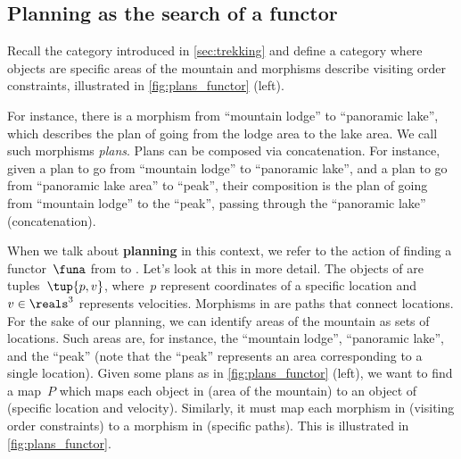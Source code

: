 \subsection{Planning as the search of a functor}

\begin{example}
    \label{ex:planning-as-search-functor}
    Recall the category \Berg introduced in \cref{sec:trekking} and define a category \Plans where objects are specific areas of the mountain and morphisms describe visiting order constraints, illustrated in \cref{fig:plans_functor} (left).

    For instance, there is a morphism from ``mountain lodge'' to ``panoramic lake'', which describes the plan of going from the lodge area to the lake area.
    We call such morphisms \emph{plans}.
    Plans can be composed via concatenation.
    For instance, given a plan to go from ``mountain lodge'' to ``panoramic lake'', and a plan to go from ``panoramic lake area'' to ``peak'', their composition is the plan of going from ``mountain lodge'' to the ``peak'', passing through the ``panoramic lake'' (concatenation).

    When we talk about \textbf{planning} in this context, we refer to the action of finding a functor~$\funa$ from \Plans to \Berg.
    Let's look at this in more detail.
    The objects of \Berg are tuples~$\tup{p,v}$, where~$p$ represent coordinates of a specific location and~$v\in \reals^3$ represents velocities.
    Morphisms in \Berg are paths that connect locations.
    For the sake of our planning, we can identify areas of the mountain as sets of locations.
    Such areas are, for instance, the ``mountain lodge'', ``panoramic lake'', and the
    ``peak'' (note that the ``peak'' represents an area corresponding to a single location).
    Given some plans as in \cref{fig:plans_functor} (left), we want to find a map~$P$ which maps each object in \Plans (area of the mountain) to an object of \Berg (specific location and velocity).
    Similarly, it must map each morphism in \Plans (visiting order constraints) to a morphism in \Berg (specific paths).
    This is illustrated in \cref{fig:plans_functor}.
\end{example}

\begin{figure*}[h!]
    \centering
    \caption{Planning functor.}
    \label{fig:plans_functor}
\end{figure*}
